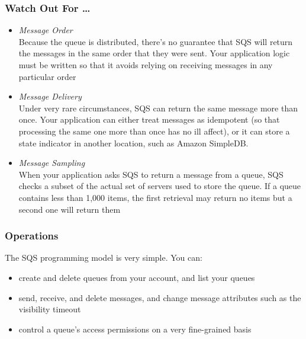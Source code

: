 \documentclass{beamer}
\begin{document}
\begin{frame}
\frametitle{Watch Out For \dots}
\begin{itemize}
\item \emph{Message Order}\\Because the queue is distributed, there’s no guarantee that SQS will return the
messages in the same order that they were sent. Your application logic must be
written so that it avoids relying on receiving messages in any particular order
\item \emph{Message Delivery}\\ Under very rare circumstances, SQS can return the same message more than
once. Your application can either treat messages as idempotent (so that processing the same one more than once has no ill affect), or it can store a state
indicator in another location, such as Amazon SimpleDB.
\item \emph{Message Sampling}\\When your application asks SQS to return a message from a queue, SQS checks
a subset of the actual set of servers used to store the queue. If a queue contains
less than 1,000 items, the first retrieval may return no items but a second one
will return them
\end{itemize}
\end{frame}
\begin{frame}[fragile]
\frametitle{Operations}
The SQS programming model is very simple. You can:
\begin{itemize}
\item create and delete queues from your account, and list your queues
\item send, receive, and delete messages, and change message attributes such as the
visibility timeout
\item control a queue’s access permissions on a very fine-grained basis
\end{itemize}
\end{frame}
\end{document}
